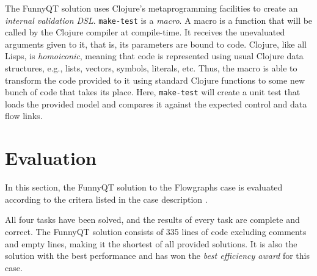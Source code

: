 \documentclass[submission]{eptcs}
\begin{document}
The FunnyQT solution uses Clojure's metaprogramming facilities to create an
\emph{internal validation DSL}.  \verb|make-test| is a \emph{macro}.  A macro
is a function that will be called by the Clojure compiler at compile-time.  It
receives the unevaluated arguments given to it, that is, its parameters are
bound to code.  Clojure, like all Lisps, is \emph{homoiconic}, meaning that
code is represented using usual Clojure data structures, e.g., lists, vectors,
symbols, literals, etc.  Thus, the macro is able to transform the code provided
to it using standard Clojure functions to some new bunch of code that takes its
place.  Here, \verb|make-test| will create a unit test that loads the provided
model and compares it against the expected control and data flow links.


\section{Evaluation}
\label{sec:evaluation}


In this section, the FunnyQT solution to the Flowgraphs case is evaluated
according to the critera listed in the case description
\cite{flowgraphcasedesc}.

All four tasks have been solved, and the results of every task are complete and
correct.  The FunnyQT solution consists of 335 lines of code excluding comments
and empty lines, making it the shortest of all provided solutions.  It is also
the solution with the best performance and has won the \emph{best efficiency
  award} for this case.





\end{document}
